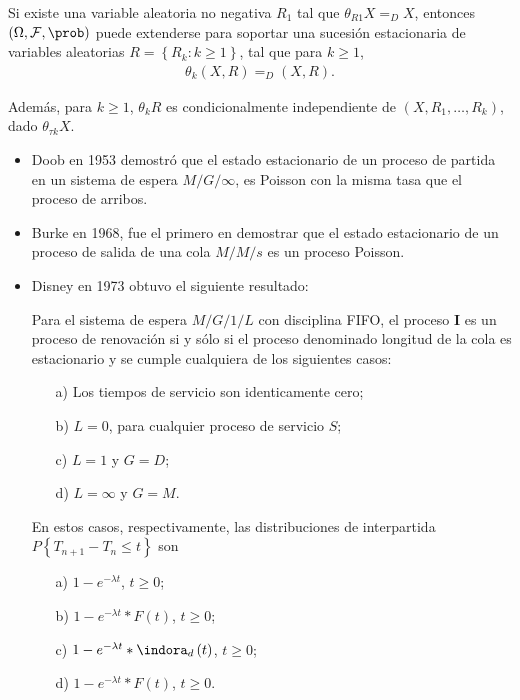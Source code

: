 \begin{Prop}
Si existe una variable aleatoria no negativa $R_{1}$ tal que $\theta_{R1}X=_{D}X$, entonces $\left(\Omega,\mathcal{F},\prob\right)$ puede extenderse para soportar una sucesi\'on estacionaria de variables aleatorias $R=\left\{R_{k}:k\geq1\right\}$, tal que para $k\geq1$,
\begin{eqnarray*}
\theta_{k}\left(X,R\right)=_{D}\left(X,R\right).
\end{eqnarray*}

Adem\'as, para $k\geq1$, $\theta_{k}R$ es condicionalmente independiente de $\left(X,R_{1},\ldots,R_{k}\right)$, dado $\theta_{\tau k}X$.

\end{Prop}


\begin{itemize}
\item Doob en 1953 demostr\'o que el estado estacionario de un proceso de partida en un sistema de espera $M/G/\infty$, es Poisson con la misma tasa que el proceso de arribos.

\item Burke en 1968, fue el primero en demostrar que el estado estacionario de un proceso de salida de una cola $M/M/s$ es un proceso Poisson.

\item Disney en 1973 obtuvo el siguiente resultado:

\begin{Teo}
Para el sistema de espera $M/G/1/L$ con disciplina FIFO, el proceso $\textbf{I}$ es un proceso de renovaci\'on si y s\'olo si el proceso denominado longitud de la cola es estacionario y se cumple cualquiera de los siguientes casos:

\begin{itemize}
\item[a)] Los tiempos de servicio son identicamente cero;
\item[b)] $L=0$, para cualquier proceso de servicio $S$;
\item[c)] $L=1$ y $G=D$;
\item[d)] $L=\infty$ y $G=M$.
\end{itemize}
En estos casos, respectivamente, las distribuciones de interpartida $P\left\{T_{n+1}-T_{n}\leq t\right\}$ son


\begin{itemize}
\item[a)] $1-e^{-\lambda t}$, $t\geq0$;
\item[b)] $1-e^{-\lambda t}*F\left(t\right)$, $t\geq0$;
\item[c)] $1-e^{-\lambda t}*\indora_{d}\left(t\right)$, $t\geq0$;
\item[d)] $1-e^{-\lambda t}*F\left(t\right)$, $t\geq0$.
\end{itemize}
\end{Teo}



\end{itemize}
